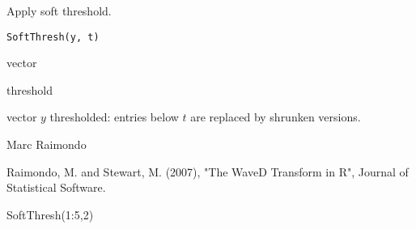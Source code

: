 \begin{Description}\relax
Apply soft threshold.
\end{Description}
\begin{Usage}
\begin{verbatim}
SoftThresh(y, t)
\end{verbatim}
\end{Usage}
\begin{Arguments}
\begin{ldescription}
\item[\code{y}] vector
\item[\code{t}] threshold 
\end{ldescription}
\end{Arguments}
\begin{Value}
vector $y$ thresholded:  entries below $t$ are replaced by shrunken versions.
\end{Value}
\begin{Author}\relax
Marc Raimondo
\end{Author}
\begin{References}\relax
Raimondo, M. and Stewart, M. (2007),
"The WaveD Transform in R", Journal of Statistical Software.
\end{References}
\begin{SeeAlso}\relax
{}
\end{SeeAlso}
\begin{Examples}
\begin{ExampleCode}
SoftThresh(1:5,2)
  \end{ExampleCode}
\end{Examples}

